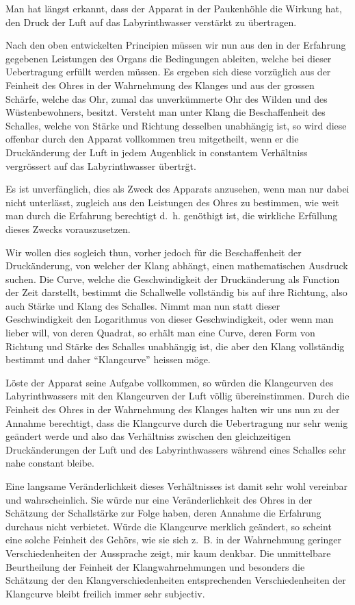 \documentclass[12pt,a4paper]{article}
\begin{document}
Man hat l\"angst erkannt, dass der Apparat in der Paukenh\"ohle die Wirkung hat, den Druck der Luft auf das Labyrinthwasser verst\"arkt zu \"ubertragen.

Nach den oben entwickelten Principien m\"ussen wir nun aus den in der Erfahrung gegebenen Leistungen des Organs die Bedingungen ableiten, welche bei dieser Uebertragung erf\"ullt werden m\"ussen. Es ergeben sich diese vorz\"uglich aus der Feinheit des Ohres in der Wahrnehmung des Klanges und aus der grossen Sch\"arfe, welche das Ohr, zumal das unverk\"ummerte Ohr des Wilden und des W\"ustenbewohners, besitzt. Versteht man unter Klang die Beschaffenheit des Schalles, welche von St\"arke und Richtung desselben unabh\"angig ist, so wird diese offenbar durch den Apparat vollkommen treu mitgetheilt, wenn er die Druck\"anderung der Luft in jedem Augenblick in constantem Verh\"altniss vergr\"ossert auf das Labyrinthwasser \"ubertr\"gt.

Es ist unverf\"anglich, dies als Zweck des Apparats anzusehen, wenn man nur dabei nicht unterl\"asst, zugleich aus den Leistungen des Ohres zu bestimmen, wie weit man durch die Erfahrung berechtigt d.\ h. gen\"othigt ist, die wirkliche Erf\"ullung dieses Zwecks vorauszusetzen.

Wir wollen dies sogleich thun, vorher jedoch f\"ur die Beschaffenheit der Druck\"anderung, von welcher der Klang abh\"angt, einen mathematischen Ausdruck suchen. Die Curve, welche die Geschwindigkeit der Druck\"anderung als Function der Zeit darstellt, bestimmt die Schallwelle vollst\"andig bis auf ihre Richtung, also auch St\"arke und Klang des Schalles. Nimmt man nun statt dieser Geschwindigkeit den Logarithmus von dieser Geschwindigkeit, oder wenn man lieber will, von deren Quadrat, so erh\"alt man eine Curve, deren Form von Richtung und St\"arke des Schalles unabh\"angig ist, die aber den Klang vollst\"andig bestimmt und daher ``Klangcurve'' heissen m\"oge.

L\"oste der Apparat seine Aufgabe vollkommen, so w\"urden die Klangcurven des Labyrinthwassers mit den Klangcurven der Luft v\"ollig \"ubereinstimmen. Durch die Feinheit des Ohres in der Wahrnehmung des Klanges halten wir uns nun zu der Annahme berechtigt, dass die Klangcurve durch die Uebertragung nur sehr wenig ge\"andert werde und also das Verh\"altniss zwischen den gleichzeitigen Druck\"anderungen der Luft und des Labyrinthwassers w\"ahrend eines Schalles sehr nahe constant bleibe.

Eine langsame Ver\"anderlichkeit dieses Verh\"altnisses ist damit sehr wohl vereinbar und wahrscheinlich. Sie w\"urde nur eine Ver\"anderlichkeit des Ohres in der Sch\"atzung der Schallst\"arke zur Folge haben, deren Annahme die Erfahrung durchaus nicht verbietet. W\"urde die Klangcurve merklich ge\"andert, so scheint eine solche Feinheit des Geh\"ors, wie sie sich z.~B. in der Wahrnehmung geringer Verschiedenheiten der Aussprache zeigt, mir kaum denkbar. Die unmittelbare Beurtheilung der Feinheit der Klangwahrnehmungen und besonders die Sch\"atzung der den Klangverschiedenheiten entsprechenden Verschiedenheiten der Klangcurve bleibt freilich immer sehr subjectiv.
\end{document}
